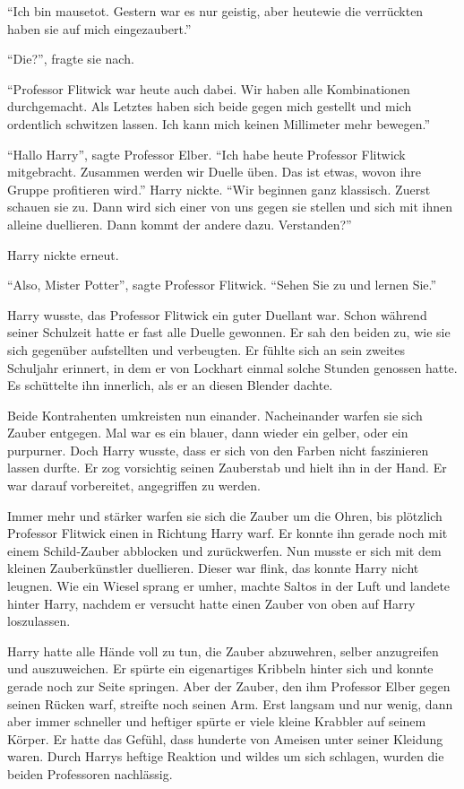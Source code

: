 \enquote{Ich bin mausetot. Gestern war es nur geistig, aber heute\abs wie die verrückten haben sie auf mich eingezaubert.}

\enquote{Die?}, fragte sie nach.

\enquote{Professor Flitwick war heute auch dabei. Wir haben alle Kombinationen durchgemacht. Als Letztes haben sich beide gegen mich gestellt und mich ordentlich schwitzen lassen. \gst Ich kann mich keinen Millimeter mehr bewegen.}

\begin{rueckblick}
\enquote{Hallo Harry}, sagte Professor Elber. \enquote{Ich habe heute Professor Flitwick mitgebracht. Zusammen werden wir Duelle üben. Das ist etwas, wovon ihre Gruppe profitieren wird.} Harry nickte. \enquote{Wir beginnen ganz klassisch. Zuerst schauen sie zu. Dann wird sich einer von uns gegen sie stellen und sich mit ihnen alleine duellieren. Dann kommt der andere dazu. \gst Verstanden?}

Harry nickte erneut.

\enquote{Also, Mister Potter}, sagte Professor Flitwick. \enquote{Sehen Sie zu und lernen Sie.}

Harry wusste, das Professor Flitwick ein guter Duellant war. Schon während seiner Schulzeit hatte er fast alle Duelle gewonnen. Er sah den beiden zu, wie sie sich gegenüber aufstellten und verbeugten. Er fühlte sich an sein zweites Schuljahr erinnert, in dem er von Lockhart einmal solche Stunden genossen hatte. Es schüttelte ihn innerlich, als er an diesen Blender dachte.

Beide Kontrahenten umkreisten nun einander. Nacheinander warfen sie sich Zauber entgegen. Mal war es ein blauer, dann wieder ein gelber, oder ein purpurner. Doch Harry wusste, dass er sich von den Farben nicht faszinieren lassen durfte. Er zog vorsichtig seinen Zauberstab und hielt ihn in der Hand. Er war darauf vorbereitet, angegriffen zu werden.

Immer mehr und stärker warfen sie sich die Zauber um die Ohren, bis plötzlich Professor Flitwick einen in Richtung Harry warf. Er konnte ihn gerade noch mit einem Schild-Zauber abblocken und zurückwerfen. Nun musste er sich mit dem kleinen Zauberkünstler duellieren. Dieser war flink, das konnte Harry nicht leugnen. Wie ein Wiesel sprang er umher, machte Saltos in der Luft und landete hinter Harry, nachdem er versucht hatte einen Zauber von oben auf Harry loszulassen.

Harry hatte alle Hände voll zu tun, die Zauber abzuwehren, selber anzugreifen und auszuweichen. Er spürte ein eigenartiges Kribbeln hinter sich und konnte gerade noch zur Seite springen. Aber der Zauber, den ihm Professor Elber gegen seinen Rücken warf, streifte noch seinen Arm. Erst langsam und nur wenig, dann aber immer schneller und heftiger spürte er viele kleine Krabbler auf seinem Körper. Er hatte das Gefühl, dass hunderte von Ameisen unter seiner Kleidung waren. Durch Harrys heftige Reaktion und wildes um sich schlagen, wurden die beiden Professoren nachlässig.


\end{rueckblick}
